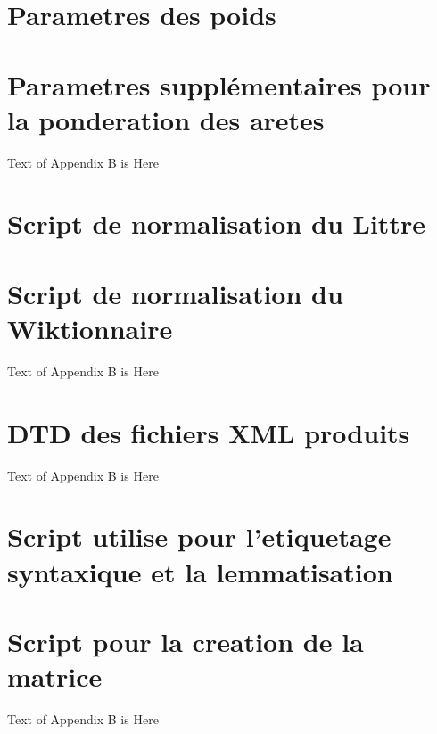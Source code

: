 \documentclass[a4paper, 12pt]{article}
\begin{document}
\appendix
\section{Parametres des poids}\label{App:weights}
%

\section{Parametres supplémentaires pour la ponderation des aretes}\label{App:otherparams}
Text of Appendix B is Here

\section{Script de normalisation du Littre}\label{App:normlittre}
%

\section{Script de normalisation du Wiktionnaire}\label{App:normwiki}
Text of Appendix B is Here

\section{DTD des fichiers XML produits}\label{App:dtddico}
Text of Appendix B is Here

\section{Script utilise pour l'etiquetage syntaxique et la lemmatisation}\label{App:tag}
%

\section{Script pour la creation de la matrice}\label{App:creatematrix}
Text of Appendix B is Here
\end{document}
